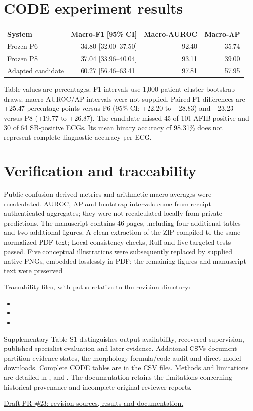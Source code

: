 \documentclass[11pt,a4paper]{article}
\begin{document}
\section*{CODE experiment results}
\begin{center}
\small
\begin{tabular}{lrrr}
\toprule
System & Macro-F1 [95\% CI] & Macro-AUROC & Macro-AP\\
\midrule
Frozen P6 & 34.80 [32.00--37.50] & 92.40 & 35.74\\
Frozen P8 & 37.04 [33.96--40.04] & 93.11 & 39.00\\
Adapted candidate & 60.27 [56.46--63.41] & 97.81 & 57.95\\
\bottomrule
\end{tabular}
\end{center}
Table values are percentages. F1 intervals use 1,000 patient-cluster bootstrap draws; macro-AUROC/AP intervals were not supplied. Paired F1 differences are +25.47 percentage points versus P6 (95\% CI: +22.20 to +28.83) and +23.23 versus P8 (+19.77 to +26.87). The candidate missed 45 of 101 AFIB-positive and 30 of 64 SB-positive ECGs. Its mean binary accuracy of 98.31\% does not represent complete diagnostic accuracy per ECG.

\section*{Verification and traceability}
Public confusion-derived metrics and arithmetic macro averages were recalculated. AUROC, AP and bootstrap intervals come from receipt-authenticated aggregates; they were not recalculated locally from private predictions. The manuscript contains 46 pages, including four additional tables and two additional figures. A clean extraction of the ZIP compiled to the same normalized PDF text; Local consistency checks, Ruff and five targeted tests passed. Five conceptual illustrations were subsequently replaced by supplied native PNGs, embedded losslessly in PDF; the remaining figures and manuscript text were preserved.

Traceability files, with paths relative to the revision directory:
\begin{itemize}
\item {}
\item {}
\item {}
\end{itemize}
Supplementary Table S1 distinguishes output availability, recovered supervision, published specialist evaluation and later evidence. Additional CSVs document partition evidence states, the morphology formula/code audit and direct model downloads. Complete CODE tables are in the  CSV files. Methods and limitations are detailed in ,  and . The documentation retains the limitations concerning historical provenance and incomplete original reviewer reports.

\href{https://github.com/Mateo197802/titan-v45-ecg-multihead/pull/23}{Draft PR \#23: revision sources, results and documentation.}
\end{document}
